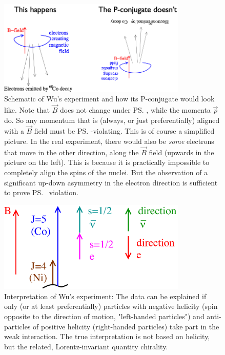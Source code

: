 \begin{figure}
\centering
\includegraphics[width=0.8\textwidth]{fig/C_P_CP/0_MadamWuSchematic}
\caption{Schematic of Wu's experiment and how its P-conjugate would look like. Note that $\vec{B}$ does not change under \ps, while the momenta $\vec{p}$ do. So any momentum that is (always, or just preferentially) aligned with a $\vec{B}$ field must be \ps-violating. This is of course a simplified picture. In the real experiment, there would also be \emph{some} electrons that move in the other direction, along the $\vec{B}$ field (upwards in the picture on the left). This is because it is practically impossible to completely align the spins of the nuclei. But the observation of a significant up-down asymmetry in the electron direction is sufficient to prove \ps\ violation.
\label{fig:WuSchematic}}
\end{figure}
\begin{figure}
\centering
\includegraphics[width=0.8\textwidth]{fig/C_P_CP/0_MadamWuInterpretation}
\caption{Interpretation of Wu's experiment: The data can be explained if only (or at least preferentially) particles with negative helicity (spin opposite to the direction of motion, "left-handed particles") and anti-particles of positive helicity (right-handed particles) take part in the weak interaction. The true interpretation is not based on helicity, but the related, Lorentz-invariant quantity chirality.
\label{fig:WuInterpretation}}
\end{figure}

